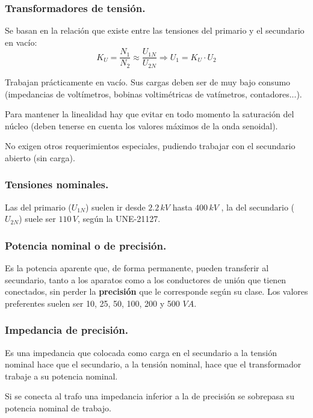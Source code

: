 		\subsubsection{Transformadores de tensión.}
		
			Se basan en la relación que existe entre las tensiones del
			primario y el secundario en vacío:
			\[K_U=\dfrac{N_1}{N_2}\approx \dfrac{U_{1N}}{U_{2N}} \Rightarrow U_1=K_U\cdot U_2 \]
			
			
			Trabajan prácticamente en vacío. Sus cargas deben ser de
			muy bajo consumo (impedancias de voltímetros, bobinas
			voltimétricas de vatímetros, contadores...).
		
			
			Para mantener la linealidad hay que evitar en todo momento la saturación del núcleo (deben tenerse en cuenta los valores máximos de la onda senoidal).
			
			
			No exigen otros requerimientos especiales, pudiendo
			trabajar con el secundario abierto (sin carga).
			
			\subsubsection*{Tensiones nominales.}
				Las del primario ($U_{1N}$) suelen ir desde $2.2\,kV$ hasta $400\,kV$ , la del secundario ($U_{2N}$) suele ser $110\,V$, según la UNE-21127.
				
			\subsubsection*{Potencia nominal o de precisión.}
				Es la potencia aparente que, de forma permanente, pueden transferir al secundario, tanto a los aparatos como a los conductores de unión que tienen conectados, sin perder la \textbf{precisión} que le corresponde según su clase. Los valores preferentes suelen ser 10, 25, 50, 100, 200 y 500 $VA$.
				
			\subsubsection*{Impedancia de precisión.}
				Es una impedancia que colocada como carga en el
				secundario a la tensión nominal hace que el
				secundario, a la tensión nominal, hace que el
				transformador trabaje a su potencia nominal.
				
				
				Si se conecta al trafo una impedancia inferior a la de
				precisión se sobrepasa su potencia nominal de trabajo.
				
